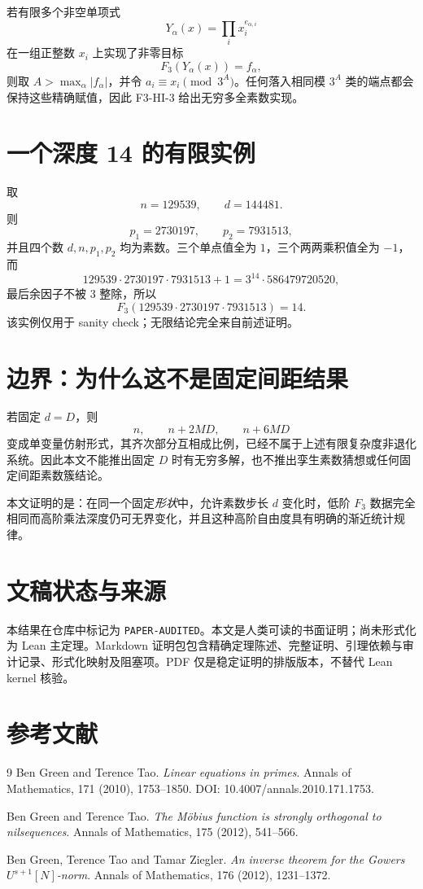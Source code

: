 \documentclass[11pt,a4paper]{ctexart}
\newcommand{\Fthree}{F_3}
\begin{document}
若有限多个非空单项式
\[
Y_\alpha(x)=\prod_i x_i^{e_{\alpha,i}}
\]
在一组正整数 $x_i$ 上实现了非零目标
\[
\Fthree(Y_\alpha(x))=f_\alpha,
\]
则取 $A>\max_\alpha|f_\alpha|$，并令 $a_i\equiv x_i\pmod{3^A}$。任何落入相同模 $3^A$ 类的端点都会保持这些精确赋值，因此 F3-HI-3 给出无穷多全素数实现。

\section{一个深度 14 的有限实例}
取
\[
n=129539,\qquad d=144481.
\]
则
\[
p_1=2730197,\qquad p_2=7931513,
\]
并且四个数 $d,n,p_1,p_2$ 均为素数。三个单点值全为 $1$，三个两两乘积值全为 $-1$，而
\[
129539\cdot2730197\cdot7931513+1
=3^{14}\cdot586479720520,
\]
最后余因子不被 $3$ 整除，所以
\[
\Fthree(129539\cdot2730197\cdot7931513)=14.
\]
该实例仅用于 sanity check；无限结论完全来自前述证明。

\section{边界：为什么这不是固定间距结果}
若固定 $d=D$，则
\[
n,\qquad n+2MD,\qquad n+6MD
\]
变成单变量仿射形式，其齐次部分互相成比例，已经不属于上述有限复杂度非退化系统。因此本文不能推出固定 $D$ 时有无穷多解，也不推出孪生素数猜想或任何固定间距素数簇结论。

本文证明的是：在同一个固定\emph{形状}中，允许素数步长 $d$ 变化时，低阶 $F_3$ 数据完全相同而高阶乘法深度仍可无界变化，并且这种高阶自由度具有明确的渐近统计规律。

\section*{文稿状态与来源}
本结果在仓库中标记为 \texttt{PAPER-AUDITED}。本文是人类可读的书面证明；尚未形式化为 Lean 主定理。Markdown 证明包包含精确定理陈述、完整证明、引理依赖与审计记录、形式化映射及阻塞项。PDF 仅是稳定证明的排版版本，不替代 Lean kernel 核验。

\section*{参考文献}
\begin{thebibliography}{9}
Ben Green and Terence Tao.
\emph{Linear equations in primes}.
Annals of Mathematics, 171 (2010), 1753--1850.
DOI: 10.4007/annals.2010.171.1753.

Ben Green and Terence Tao.
\emph{The Möbius function is strongly orthogonal to nilsequences}.
Annals of Mathematics, 175 (2012), 541--566.

Ben Green, Terence Tao and Tamar Ziegler.
\emph{An inverse theorem for the Gowers $U^{s+1}[N]$-norm}.
Annals of Mathematics, 176 (2012), 1231--1372.
\end{thebibliography}
\end{document}
